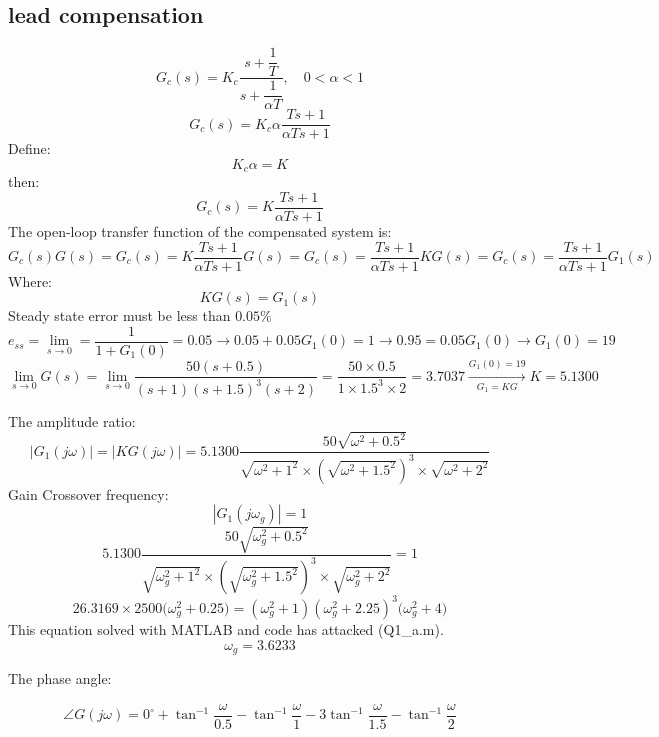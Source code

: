 \subsection{lead compensation}
$$
G_c(s) = K_c\dfrac{s + \dfrac{1}{T}}{s+\dfrac{1}{\alpha T}}, \quad 0 < \alpha < 1
$$
$$
G_c(s) = K_c \alpha \dfrac{Ts + 1}{\alpha T s + 1}
$$
Define:
$$K_c\alpha = K$$
then:
$$
G_c(s) = K \dfrac{Ts + 1}{\alpha T s + 1}
$$
The open-loop transfer function of the compensated system is:
$$
G_c(s)G(s) = G_c(s) = K \dfrac{Ts + 1}{\alpha T s + 1} G(s)
= G_c(s) = \dfrac{Ts + 1}{\alpha T s + 1}KG(s) = G_c(s) = \dfrac{Ts + 1}{\alpha T s + 1}G_1(s)
$$
Where:
$$
KG(s)= G_1(s)
$$
Steady state error must be less than $0.05\%$
$$
e_{ss} = \lim_{s\to 0} = \dfrac{1}{1+G_1(0)} = 0.05 \to 0.05 + 0.05G_1(0) = 1 \to 0.95 = 0.05G_1(0) \to G_1(0) = 19
$$
$$
\lim_{s\to 0} G(s) = \lim_{s\to 0} \dfrac{50(s+0.5)}{(s+1)(s+1.5)^{3}(s+2)} = \dfrac{50\times0.5}{1\times1.5^3\times2} = 3.7037 \xrightarrow[G_1 = KG]{G_1(0) = 19} K = 5.1300
$$




The amplitude ratio:
$$
\left\vert G_1(j\omega) \right\vert = \left\vert KG(j\omega) \right\vert = 5.1300\dfrac{50\sqrt{\omega^2+0.5^2}}{\sqrt{\omega^2+1^2}\times(\sqrt{\omega^2 + 1.5^2})^3\times\sqrt{\omega^2 + 2^2}}
$$
Gain Crossover frequency:
$$
\left\vert G_1(j\omega_g) \right\vert = 1
$$
\newline
$$
5.1300\dfrac{50\sqrt{\omega_g^2+0.5^2}}{\sqrt{\omega_g^2+1^2}\times(\sqrt{\omega_g^2 + 1.5^2})^3\times\sqrt{\omega_g^2 + 2^2}} = 1
$$
$$
{26.3169\times2500({\omega_g^2+0.25}}) = 
{({\omega_g^2+1})({\omega_g^2 + 2.25})^3({\omega_g^2 + 4}})
$$
This equation solved with MATLAB and code has attacked (Q1\_a.m).
$$
\omega_g = 3.6233
$$

The phase angle:

$$
\angle G(j\omega) = 0^{\circ} + \tan^{-1}\dfrac{\omega}{0.5} - \tan^{-1}\dfrac{\omega}{1} - 3\tan^{-1}\dfrac{\omega}{1.5} - \tan^{-1}\dfrac{\omega}{2}
$$

